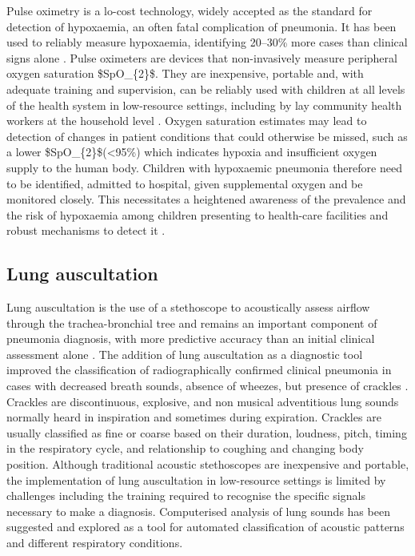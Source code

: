 Pulse oximetry is a lo-cost technology, widely accepted as the standard for detection of hypoxaemia, an often fatal complication of pneumonia. It has been used to reliably measure hypoxaemia, identifying 20–30\% more cases than clinical signs alone \cite{duke2009pulse}.
 Pulse oximeters are devices that non-invasively measure peripheral oxygen saturation \gls{$SpO_{2}$}. They are inexpensive, portable and, with adequate training and supervision, can be reliably used with children at all levels of the health system in low-resource settings, including by lay community health workers at the household level \cite{goodman2019challenges}. Oxygen saturation estimates may lead to detection of changes in patient conditions that could otherwise be missed, such as a lower \gls{$SpO_{2}$}(<95\%) which indicates hypoxia and insufficient oxygen supply to the human body.
Children with hypoxaemic pneumonia therefore need to be identified, admitted to hospital, given supplemental oxygen and be monitored closely. This necessitates a heightened awareness of the prevalence and the risk of hypoxaemia among children presenting to health-care facilities and robust mechanisms to detect it \cite{subhi2009prevalence}.

\subsection{Lung auscultation}

Lung auscultation is the use of a stethoscope to acoustically assess airflow through the trachea-bronchial tree and remains an important component of pneumonia diagnosis, with more predictive accuracy than an initial clinical assessment alone \cite{pervaiz2018building}. 
The addition of lung auscultation as a diagnostic tool improved the classification of radiographically confirmed clinical pneumonia in cases with decreased breath sounds, absence of wheezes, but presence of crackles \cite{pervaiz2018building}. Crackles are discontinuous, explosive, and non musical adventitious lung sounds normally heard in inspiration and sometimes during expiration. Crackles are usually classified as fine or coarse based on their duration, loudness, pitch, timing in the respiratory cycle, and relationship to coughing and changing body position\cite{sarkar2015auscultation}. Although traditional acoustic stethoscopes are inexpensive and portable, the implementation of lung auscultation in low-resource settings is limited by challenges including the training required to recognise the specific signals necessary to make a diagnosis. Computerised analysis of lung sounds has been suggested and explored as a tool for automated classification of acoustic patterns and different respiratory conditions.

